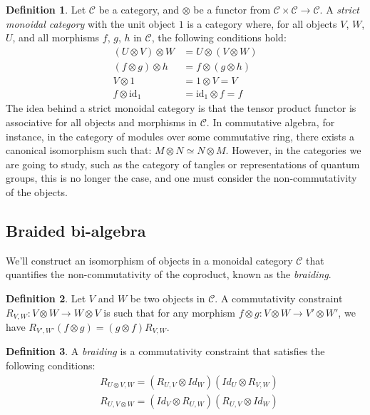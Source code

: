\documentclass[11pt]{article}
\theoremstyle{definition}
\newtheorem{Def}{Definition}[section]
\begin{document}
\begin{Def} 
Let \(\mathcal{C}\) be a category, and \(\otimes\) be a functor from \(\mathcal{C}\times\mathcal{C}\to \mathcal{C}\). A \textit{strict monoidal category} with the unit object \(1\) is a category where, for all objects \(V\), \(W\), \(U\), and all morphisms \(f\), \(g\), \(h\) in \(\mathcal{C}\), the following conditions hold:
\begin{align}
(U\otimes V)\otimes W & = U\otimes(V\otimes W) \\
(f\otimes g)\otimes h & = f\otimes(g\otimes h)\\
V\otimes 1 & = 1\otimes V = V\\
f\otimes \text{id}_{1} & = \text{id}_{1}\otimes f = f 
\end{align}
The idea behind a strict monoidal category is that the tensor product functor is associative for all objects and morphisms in \(\mathcal{C}\).
In commutative algebra, for instance, in the category of modules over some commutative ring, there exists a canonical isomorphism such that: \(M\otimes N\simeq N\otimes M\). However, in the categories we are going to study, such as the category of tangles or representations of quantum groups, this is no longer the case, and one must consider the non-commutativity of the objects.
\end{Def}

\subsection{\Large \textbf{Braided bi-algebra}} 



We'll construct an isomorphism of objects in a monoidal category \(\mathcal{C}\) that quantifies the non-commutativity of the coproduct, known as the \textit{braiding}.
\begin{Def}
Let \(V\) and \(W\) be two objects in \(\mathcal{C}\). A commutativity constraint \(R_{V,W}: V\otimes W\to W\otimes V\) is such that for any morphism \(f\otimes g : V\otimes W\to V'\otimes W'\), we have \(R_{V',W'}(f\otimes g) = (g\otimes f)R_{V,W}\).
\end{Def}

\begin{Def}
A \textit{braiding} is a commutativity constraint that satisfies the following conditions:
\begin{align*}
&R_{U\otimes V,W} = (R_{U,V}\otimes Id_W)(Id_U\otimes R_{V,W})\\
&R_{U,V\otimes W} = (Id_V\otimes R_{U,W})(R_{U,V}\otimes Id_W)
\end{align*}
\end{Def}
\end{document}
